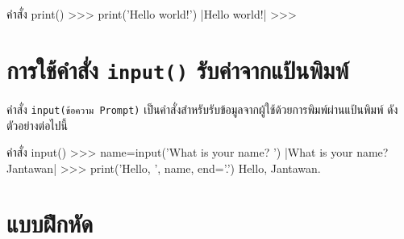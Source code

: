 \begin{codelist}{คำสั่ง print()}{}
>>> print('Hello world!')
|Hello world!|
>>>
\end{codelist}


\section{การใช้คำสั่ง \texttt{input()} รับค่าจากแป้นพิมพ์}

คำสั่ง \texttt{input(ข้อความ Prompt)} เป็นคำสั่งสำหรับรับข้อมูลจากผู้ใช้ด้วยการพิมพ์ผ่านแป้นพิมพ์ ดังตัวอย่างต่อไปนี้

\begin{codelist}{คำสั่ง input()}{}
>>> name=input('What is your name? ')
|What is your name? Jantawan|
>>> print('Hello, ', name, end='.')
Hello, Jantawan.
\end{codelist}


\section{แบบฝึกหัด}

